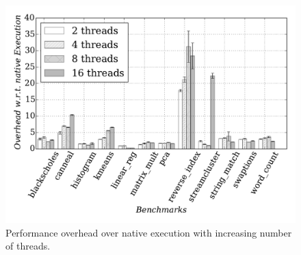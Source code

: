 
\begin{figure}[t]
\centering
\includegraphics[scale=0.46]{figure/benchmarks/times-inspector.pdf}
\caption{Performance overhead  over native execution with increasing number of threads.}
\label{fig:overheads}
\end{figure}
